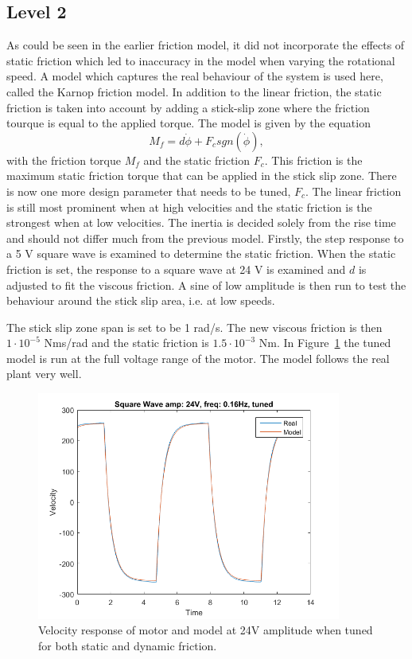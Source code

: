 \documentclass[12pt,a4paper]{article}
\begin{document}
\subsection*{Level 2}
\label{sub:level_2}
As could be seen in the earlier friction model, it did not incorporate the
effects of static friction which led to inaccuracy in the model when varying the
rotational speed. A model which captures the real behaviour of the system is
used here, called the Karnop friction model. In addition to the linear friction,
the static friction is taken into account by adding a stick-slip zone where the
friction tourque is equal to the applied torque. The model is given by the
equation
\begin{equation}
    \label{eq:karnop}
    M_f = d \dot{\phi} + F_c sgn(\dot{\phi}),
\end{equation}
with the friction torque $M_f$ and the static friction $F_c$. This
friction is the maximum static friction torque that can be applied in
the stick slip zone.  There is now one more design parameter that needs
to be tuned, $F_c$.  The linear friction is still most prominent when at
high velocities and the static friction is the strongest when at low
velocities. The inertia is decided solely from the rise time and should
not differ much from the previous model. Firstly, the step response to
a 5 V square wave is examined to determine the static friction. When the
static friction is set, the response to a square wave at 24 V is
examined and $d$ is adjusted to fit the viscous friction. A sine of low
amplitude is then run to test the behaviour around the stick slip area,
i.e.  at low speeds.\par
The stick slip zone span is set to be 1 rad/s. The new viscous friction is then
$1\cdot 10^{-5}$ Nms/rad and the static friction is $1.5\cdot 10^{-3}$ Nm.
In Figure~\ref{fig:l2_sq_a24_f016_fcTuned} the tuned model is run at the full
voltage range of the motor. The model follows the real plant very well.
\begin{figure}[H]
    \centering
    \includegraphics[width=100mm]{l2_sq_a24_f016_fcTuned.png}
    \caption{Velocity response of motor and model at 24V amplitude when
    tuned for both static and dynamic friction.}
    \label{fig:l2_sq_a24_f016_fcTuned}
\end{figure}
\end{document}
